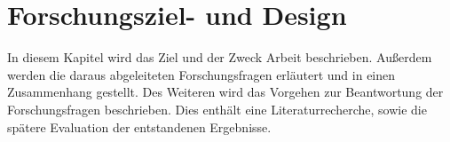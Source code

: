 \chapter{Forschungsziel- und Design}

In diesem Kapitel wird das Ziel und der Zweck Arbeit beschrieben. Außerdem werden die daraus abgeleiteten Forschungsfragen erläutert und in einen Zusammenhang gestellt. Des Weiteren wird das Vorgehen zur Beantwortung der Forschungsfragen beschrieben. Dies enthält eine Literaturrecherche, sowie die spätere Evaluation der entstandenen Ergebnisse.





